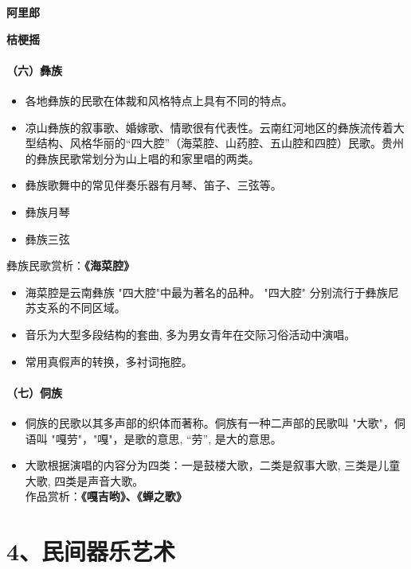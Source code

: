 \documentclass[
]{article}
\providecommand{\tightlist}{%
  \setlength{\itemsep}{0pt}\setlength{\parskip}{0pt}}
\begin{document}
\textbf{阿里郎}

\textbf{桔梗摇}

\paragraph{（六）彝族}\label{ux516dux5f5dux65cf}

\begin{itemize}
\tightlist
\item
  各地彝族的民歌在体裁和风格特点上具有不同的特点。
\item
  凉山彝族的叙事歌、婚嫁歌、情歌很有代表性。云南红河地区的彝族流传着大型结构、风格华丽的``四大腔''（海菜腔、山药腔、五山腔和四腔）民歌。贵州的彝族民歌常划分为山上唱的和家里唱的两类。
\item
  彝族歌舞中的常见伴奏乐器有月琴、笛子、三弦等。
\item
  彝族月琴
\item
  彝族三弦
\end{itemize}

彝族民歌赏析：\textbf{《海菜腔》}

\begin{itemize}
\tightlist
\item
  海菜腔是云南彝族 "四大腔"中最为著名的品种。 "四大腔"
  分别流行于彝族尼苏支系的不同区域。
\item
  音乐为大型多段结构的套曲, 多为男女青年在交际习俗活动中演唱。
\item
  常用真假声的转换，多衬词拖腔。
\end{itemize}

\paragraph{（七）侗族}\label{ux4e03ux4f97ux65cf}

\begin{itemize}
\tightlist
\item
  侗族的民歌以其多声部的织体而著称。侗族有一种二声部的民歌叫
  "大歌"，侗语叫 "嘎劳"，"嘎"，是歌的意思, ``劳'', 是大的意思。
\item
  大歌根据演唱的内容分为四类：一是鼓楼大歌，二类是叙事大歌,
  三类是儿童大歌, 四类是声音大歌。\\
  作品赏析：\textbf{《嘎吉哟》、《蝉之歌》}
\end{itemize}

\section{4、民间器乐艺术}\label{ux6c11ux95f4ux5668ux4e50ux827aux672f}
\end{document}
